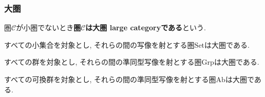\subsubsection{大圏}
\begin{Def}
圏$\mathscr{C}$が小圏でないとき{\bf 圏$\mathscr{C}$は大圏 large categoryである}という.
\end{Def}

\begin{Prop}
すべての小集合を対象とし, それらの間の写像を射とする圏$\mathrm{Set}$は大圏である.
\end{Prop}

\begin{Prop}
すべての群を対象とし, それらの間の準同型写像を射とする圏$\mathrm{Grp}$は大圏である.
\end{Prop}
\begin{comment}
\begin{proof}
\end{proof}
\end{comment}

\begin{Prop}
すべての可換群を対象とし, それらの間の準同型写像を射とする圏$\mathrm{Ab}$は大圏である.
\end{Prop}
\begin{comment}
\begin{proof}
\end{proof}
\end{comment}

\begin{comment}
*************************
\begin{Prop}
すべての位相空間\footnote{定義を本文から外している}を対象とし, それらの間の連続写像\footnote{定義を本文から外している}を射とする圏$\mathrm{Top}$は大圏である.
\end{Prop}
\end{comment}
\begin{comment}
*************************
\begin{example}
ある体\footnote{定義を本文から外している}$k$に対して,
すべての$k$次線形空間\footnote{未定義}を対象とし,
それらの間の$k$次線形写像\footnote{未定義}を射とする
圏$\mathrm{Vect}_k$は大圏である.
\end{example}
***************************
\end{comment}


